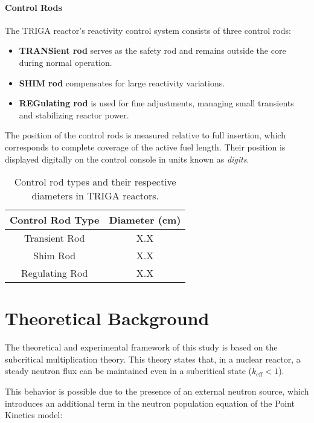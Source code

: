 \paragraph{Control Rods} The TRIGA reactor's reactivity control system consists of three control rods:

\begin{itemize}
    \item \textbf{TRANSient rod} serves as the safety rod and remains outside the core during normal operation.
    \item \textbf{SHIM rod} compensates for large reactivity variations.
    \item \textbf{REGulating rod} is used for fine adjustments, managing small transients and stabilizing reactor power.
\end{itemize}

The position of the control rods is measured relative to full insertion, which corresponds to complete coverage of the active fuel length. Their position is displayed digitally on the control console in units known as \textit{digits}.

\begin{table}[H]
    \centering
    \begin{tabular}{|c|c|}
        \hline
        \textbf{Control Rod Type} & \textbf{Diameter (cm)} \\
        \hline
        Transient Rod & X.X \\  %
        Shim Rod & X.X \\
        Regulating Rod & X.X \\
        \hline
    \end{tabular}
    \caption{Control rod types and their respective diameters in TRIGA reactors.}
    \label{tab:control_rods}
\end{table}


\section{Theoretical Background}

The theoretical and experimental framework of this study is based on the subcritical multiplication theory. This theory states that, in a nuclear reactor, a steady neutron flux can be maintained even in a subcritical state ($ k_{\text{eff}} < 1 $). 

This behavior is possible due to the presence of an external neutron source, which introduces an additional term in the neutron population equation of the Point Kinetics model:

